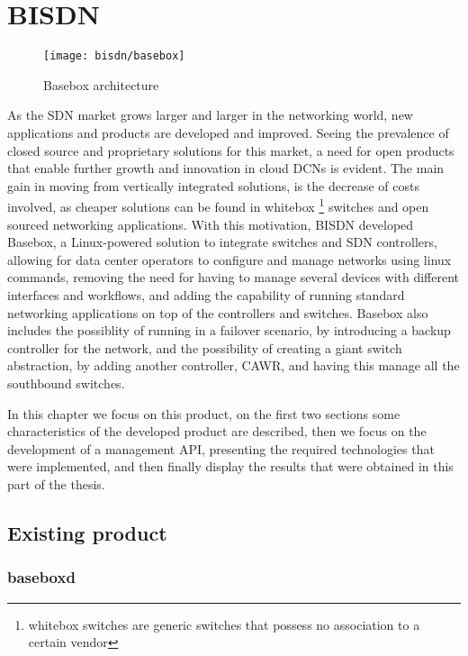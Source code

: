 \chapter {BISDN} \label{chap:bisdn} %

\begin{figure} [!htbp]
    \centering
    \texttt{[image: bisdn/basebox]}
    \caption{Basebox architecture}
\end{figure}

As the SDN market grows larger and larger in the networking world, new applications and products are developed and improved. Seeing the prevalence of closed source and proprietary solutions for this market, a need for open
products that enable further growth and innovation in cloud DCNs is evident. The main gain in moving from vertically integrated solutions, is the decrease of costs involved, as cheaper solutions can be found in whitebox 
\footnote {whitebox switches are generic switches that possess no association to a certain vendor} switches and open sourced networking applications. With this motivation, BISDN developed Basebox, a Linux-powered solution to integrate switches and SDN controllers, 
allowing for data center  operators to configure and manage networks using linux commands, removing the need for having to manage several devices with different interfaces and workflows, and adding the capability of running standard networking applications 
on top of the controllers and switches. Basebox also includes the possiblity of running in a failover scenario, by introducing a backup controller for the network, and the possibility of creating a giant switch abstraction, 
by adding another controller, CAWR, and having this manage all the southbound switches.

\par In this chapter we focus on this product, on the first two sections some characteristics of the developed product are described, then we focus on the development of a management API, presenting the required technologies that 
were implemented, and then finally display the results that were obtained in this part of the thesis.

\section {Existing product}

\subsection {baseboxd}

